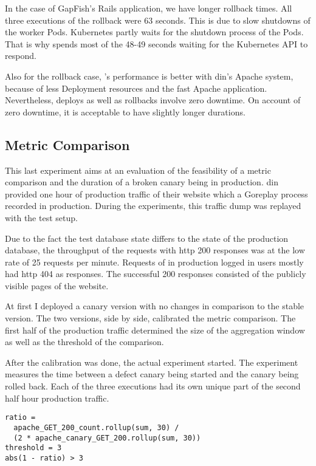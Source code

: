 In the case of GapFish's Rails application, we have longer rollback times. All three
executions of the rollback were 63 seconds. This is due to slow shutdowns of the worker
Pods. Kubernetes partly waits for the shutdown process of the Pods. That is why
\deployer{} spends most of the 48-49 seconds waiting for the Kubernetes API to respond.

Also for the rollback case, \deployer{}'s performance is better with \gls{din}'s Apache system,
because of less Deployment resources and the fast Apache application. Nevertheless,
deploys as well as rollbacks involve zero downtime. On account of zero downtime, it is acceptable to have slightly longer durations.

\subsection{Metric Comparison}
\label{sec:eval_metrics}

This last experiment aims at an evaluation of the feasibility
of a metric comparison and the duration of a broken canary being in production. \gls{din}
provided one hour of production traffic of their website which a Goreplay process
recorded in production. During the experiments, this traffic dump was replayed with the test setup.

Due to the fact the test database state differs to the state of the production database, the
throughput of the requests with \gls{http} 200 responses was at the low rate of 25 requests per
minute. Requests of in production logged in users mostly had \gls{http} 404 as responses. The
successful 200 responses consisted of the publicly visible pages of the website.

At first I deployed a canary version with no changes in comparison to the stable version. The
two versions, side by side, calibrated the metric comparison. The first half of the
production traffic determined the size of the aggregation window as well as the threshold
of the comparison.

After the calibration was done, the actual experiment started. The experiment measures the
time between a defect canary being started and the canary being rolled back. Each
of the three executions had its own unique part of the second half hour production traffic.

\begin{verbatim}
ratio =
  apache_GET_200_count.rollup(sum, 30) /
  (2 * apache_canary_GET_200.rollup(sum, 30))
threshold = 3
abs(1 - ratio) > 3
\end{verbatim}

